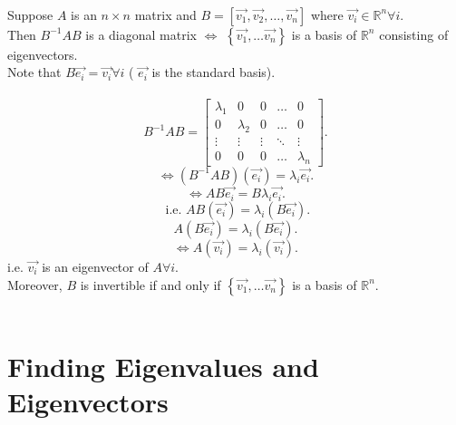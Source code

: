 \documentclass{report}
\begin{document}
  \\
  {
    Suppose $ A$ is an $n \times n$  matrix and $ B = \left[ \vec{ v_1} , \vec{ v_2} ,\ldots , \vec{ v_n}  \right]$ where $ \vec{ v_i } \in \mathbb{R} ^{n} \forall  i $.\\
    Then $ B^{-1}A B$ is a diagonal matrix $ \iff$  $ \left\{ \vec{ v_1} ,\ldots \vec{ v_n}  \right\} $ is a basis of $ \mathbb{R} ^{n}$ consisting of eigenvectors.
  \\
  Note that $ B \vec{ e_i } = \vec{ v_i} \forall  i$ ( $ \vec{ e_i} $ is the standard basis).\\
  \\
  \[
  B^{-1} A B = \begin{bmatrix}
      \lambda_1 & 0 & 0 & \dots  & 0 \\
      0 & \lambda_2 & 0 & \dots  & 0 \\
      \vdots & \vdots & \vdots & \ddots & \vdots \\
      0 & 0 & 0 & \dots  & \lambda_n\end{bmatrix}
  .\] 
  \[
   \iff \left( B^{-1} A B \right) \left( \vec{ e_i}  \right) = \lambda _i \vec{ e_i} 
  .\] 
  \[
  \iff A B \vec{ e_i} = B \lambda_i \vec{ e_i}
  .\] 
  \[
  \text{ i.e. } AB \left( \vec{ e_i}  \right) = \lambda_i \left( B \vec{ e_i}  \right) 
  .\] 
  \[
  A \left( B \vec{ e_i}  \right) = \lambda_i \left( B \vec{ e_i}  \right)
  .\] 
  \[
  \iff A \left( \vec{ v_i}  \right) = \lambda_i \left( \vec{ v_i}  \right)
  .\] 
  i.e. $ \vec{ v_i} $ is an eigenvector of $ A \forall  i$.\\
  Moreover, $ B$ is invertible if and only if $ \left\{ \vec{ v_1} ,\ldots \vec{ v_n}  \right\} $ is a basis of $ \mathbb{R} ^{n}$.
}
\\
  \\
  \section{Finding Eigenvalues and Eigenvectors}
    
\end{document}
